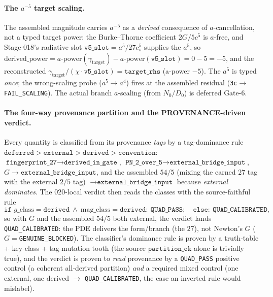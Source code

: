 \paragraph{The \texorpdfstring{\(a^{-5}\)}{a^-5} target scaling.}
The assembled magnitude carries \(a^{-5}\) as a \emph{derived} consequence of \(a\)-cancellation,
not a typed target power: the Burke--Thorne coefficient \(2G/5c^5\) is \(a\)-free, and Stage-018's
radiative slot \(\texttt{v5\_slot}=a^5/27c_s^5\) supplies the \(a^5\), so
\(\mathrm{derived\_power}=a\text{-power}(\gamma_{\mathrm{target}})-a\text{-power}(\texttt{v5\_slot})=0-5=-5\),
and the reconstructed \(\gamma_{\mathrm{target}}/(\chi\cdot\texttt{v5\_slot})=\texttt{target\_rhs}\)
(a-power \(-5\)). The \(a^5\) is typed \emph{once}; the wrong-scaling probe (\(a^5\to a^4\)) fires at
the assembled residual (\texttt{3c}\(\to\)\texttt{FAIL\_SCALING}). The actual branch \(a\)-scaling
(from \(N_0/D_0\)) is deferred Gate-6.

\paragraph{The four-way provenance partition and the PROVENANCE-driven verdict.}
Every quantity is classified from its provenance \emph{tags} by a tag-dominance rule
\(\texttt{deferred}>\texttt{external}>\texttt{derived}>\texttt{convention}\):
\(\texttt{fingerprint\_27}\to\texttt{derived\_in\_gate}\),
\(\texttt{PN\_2\_over\_5}\to\texttt{external\_bridge\_input}\),
\(G\to\texttt{external\_bridge\_input}\), and the assembled \(54/5\) (mixing the earned \(27\) tag with
the external \(2/5\) tag) \(\to\texttt{external\_bridge\_input}\) because \emph{external dominates}. The
020-local verdict then reads the classes with the source-faithful rule
\[
  \texttt{if } g\_\mathrm{class}=\texttt{derived}\ \wedge\ \mathrm{mag}\_\mathrm{class}=\texttt{derived}:\ \texttt{QUAD\_PASS};
  \quad\texttt{else}:\ \texttt{QUAD\_CALIBRATED},
\]
so with \(G\) and the assembled \(54/5\) both external, the verdict lands \texttt{QUAD\_CALIBRATED}:
the PDE delivers the form/branch (the \(27\)), not Newton's \(G\) (\(G=\)\texttt{GENUINE\_BLOCKED}). The
classifier's dominance rule is proven by a truth-table + key-class + tag-mutation tooth (the source
\(\texttt{partition\_ok}\) alone is trivially true), and the verdict is proven to \emph{read} provenance
by a \texttt{QUAD\_PASS} positive control (a coherent all-derived partition) \emph{and} a required mixed
control (one external, one derived \(\to\) \texttt{QUAD\_CALIBRATED}, the case an inverted rule would
mislabel).

